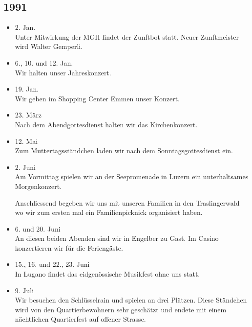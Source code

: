 \subsection{1991}

\begin{history}


    \begin{itemize}

        \item 2. Jan.\\
              Unter Mitwirkung der MGH findet der Zunftbot statt. Neuer Zunftmeister
              wird Walter Gemperli.

        \item 6., 10. und 12. Jan.\\
              Wir halten unser Jahreskonzert.

        \item 19. Jan.\\
              Wir geben im Shopping Center Emmen unser Konzert.

        \item 23. März\\
              Nach dem Abendgottesdienst halten wir das Kirchenkonzert.

        \item 12. Mai\\
              Zum Muttertagsständchen laden wir nach dem Sonntagsgottesdienst ein.

        \item 2. Juni\\
              Am Vormittag spielen wir an der Seepromenade in Luzern ein
              unterhaltsames Morgenkonzert.

              Anschliessend begeben wir uns mit unseren Familien in den Traslingerwald
              wo wir zum ersten mal ein Familienpicknick organisiert haben.

        \item 6. und 20. Juni\\
              An diesen beiden Abenden sind wir in Engelber zu Gast. Im Casino
              konzertieren wir für die Feriengäste.

        \item 15., 16. und 22., 23. Juni\\
              In Lugano findet das eidgenössische Musikfest ohne uns statt.

        \item 9. Juli\\
              Wir besuchen den Schlüsselrain und spielen an drei Plätzen. Diese
              Ständchen wird von den Quartierbewohnern sehr geschätzt und endete mit
              einem nächtlichen Quartierfest auf offener Strasse.


\end{itemize}
\end{history}
